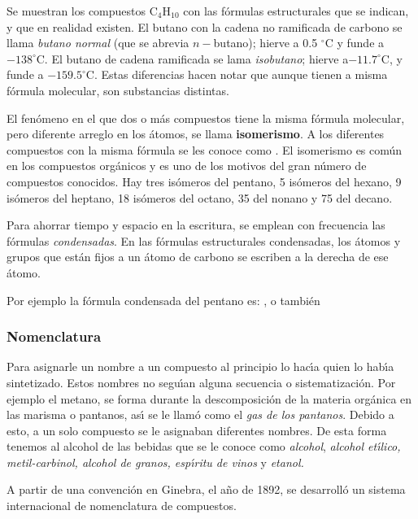 Se muestran los compuestos  C$_4$H$_{10}$ con las f\'ormulas estructurales que se
indican, y que en realidad existen. El butano con la cadena no ramificada de carbono se
llama
\textit{butano normal} (que se abrevia $n-$butano); hierve a 0.5 $^\circ$C y funde a
$-138^\circ$C. El  butano de cadena ramificada se lama \textit{isobutano}; hierve a$-
11.7^\circ$C, y funde a $-159.5^\circ$C. Estas diferencias hacen notar que aunque
tienen a misma f\'ormula molecular, son substancias distintas.

El fen\'omeno en el que dos o m\'as compuestos tiene la misma f\'ormula molecular, pero
diferente arreglo en los \'atomos, se llama \textbf{isomerismo}. A los diferentes
compuestos con la misma f\'ormula se les conoce como \textbf{}. 
 El isomerismo es com\'un en los compuestos org\'anicos y es uno de
los motivos del gran n\'umero de compuestos conocidos. Hay tres is\'omeros del pentano,
5 is\'omeros del hexano, 9 is\'omeros del heptano, 18 is\'omeros del octano, 35 del
nonano y 75 del decano.

Para ahorrar tiempo y espacio en la escritura, se emplean con frecuencia las f\'ormulas
\textit{condensadas}.  En las f\'ormulas estructurales condensadas, los
\'atomos y grupos que est\'an fijos a un \'atomo de carbono se escriben a la derecha de
ese \'atomo.

  Por ejemplo la f\'ormula condensada del pentano es:  
,
 o tambi\'en 

\subsubsection{Nomenclatura}

Para asignarle un nombre a un compuesto al principio lo hac\'{\i}a quien lo hab\'{\i}a
sintetizado. Estos nombres no segu\'{\i}an alguna secuencia o sistematizaci\'on. Por
ejemplo el metano, se forma durante la descomposici\'on de la materia org\'anica en las
marisma o pantanos, as\'{\i} se le llam\'o como el \textit{gas de los pantanos}. Debido
a esto, a un solo compuesto se le asignaban diferentes nombres. De esta forma tenemos al
alcohol de las bebidas que se le conoce como \textit{alcohol}, \textit{alcohol
et\'{\i}lico, metil-carbinol, alcohol de granos, esp\'{\i}ritu de vinos} y
\textit{etanol.}

A partir de una convenci\'on en Ginebra, el a\~no de 1892, se desarroll\'o un sistema internacional de nomenclatura de compuestos.


